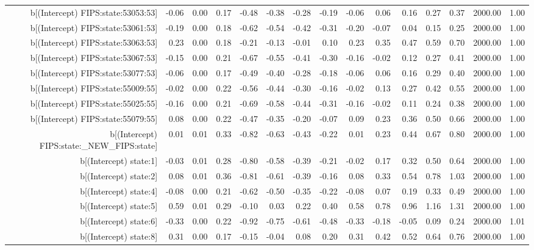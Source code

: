 \begin{table}[ht]
\begin{tabular}{rrrrrrrrrrrrrrr}
  b[(Intercept) FIPS:state:53053:53] & -0.06 & 0.00 & 0.17 & -0.48 & -0.38 & -0.28 & -0.19 & -0.06 & 0.06 & 0.16 & 0.27 & 0.37 & 2000.00 & 1.00 \\ 
  b[(Intercept) FIPS:state:53061:53] & -0.19 & 0.00 & 0.18 & -0.62 & -0.54 & -0.42 & -0.31 & -0.20 & -0.07 & 0.04 & 0.15 & 0.25 & 2000.00 & 1.00 \\ 
  b[(Intercept) FIPS:state:53063:53] & 0.23 & 0.00 & 0.18 & -0.21 & -0.13 & -0.01 & 0.10 & 0.23 & 0.35 & 0.47 & 0.59 & 0.70 & 2000.00 & 1.00 \\ 
  b[(Intercept) FIPS:state:53067:53] & -0.15 & 0.00 & 0.21 & -0.67 & -0.55 & -0.41 & -0.30 & -0.16 & -0.02 & 0.12 & 0.27 & 0.41 & 2000.00 & 1.00 \\ 
  b[(Intercept) FIPS:state:53077:53] & -0.06 & 0.00 & 0.17 & -0.49 & -0.40 & -0.28 & -0.18 & -0.06 & 0.06 & 0.16 & 0.29 & 0.40 & 2000.00 & 1.00 \\ 
  b[(Intercept) FIPS:state:55009:55] & -0.02 & 0.00 & 0.22 & -0.56 & -0.44 & -0.30 & -0.16 & -0.02 & 0.13 & 0.27 & 0.42 & 0.55 & 2000.00 & 1.00 \\ 
  b[(Intercept) FIPS:state:55025:55] & -0.16 & 0.00 & 0.21 & -0.69 & -0.58 & -0.44 & -0.31 & -0.16 & -0.02 & 0.11 & 0.24 & 0.38 & 2000.00 & 1.00 \\ 
  b[(Intercept) FIPS:state:55079:55] & 0.08 & 0.00 & 0.22 & -0.47 & -0.35 & -0.20 & -0.07 & 0.09 & 0.23 & 0.36 & 0.50 & 0.66 & 2000.00 & 1.00 \\ 
  b[(Intercept) FIPS:state:\_NEW\_FIPS:state] & 0.01 & 0.01 & 0.33 & -0.82 & -0.63 & -0.43 & -0.22 & 0.01 & 0.23 & 0.44 & 0.67 & 0.80 & 2000.00 & 1.00 \\ 
  b[(Intercept) state:1] & -0.03 & 0.01 & 0.28 & -0.80 & -0.58 & -0.39 & -0.21 & -0.02 & 0.17 & 0.32 & 0.50 & 0.64 & 2000.00 & 1.00 \\ 
  b[(Intercept) state:2] & 0.08 & 0.01 & 0.36 & -0.81 & -0.61 & -0.39 & -0.16 & 0.08 & 0.33 & 0.54 & 0.78 & 1.03 & 2000.00 & 1.00 \\ 
  b[(Intercept) state:4] & -0.08 & 0.00 & 0.21 & -0.62 & -0.50 & -0.35 & -0.22 & -0.08 & 0.07 & 0.19 & 0.33 & 0.49 & 2000.00 & 1.00 \\ 
  b[(Intercept) state:5] & 0.59 & 0.01 & 0.29 & -0.10 & 0.03 & 0.22 & 0.40 & 0.58 & 0.78 & 0.96 & 1.16 & 1.31 & 2000.00 & 1.00 \\ 
  b[(Intercept) state:6] & -0.33 & 0.00 & 0.22 & -0.92 & -0.75 & -0.61 & -0.48 & -0.33 & -0.18 & -0.05 & 0.09 & 0.24 & 2000.00 & 1.01 \\ 
  b[(Intercept) state:8] & 0.31 & 0.00 & 0.17 & -0.15 & -0.04 & 0.08 & 0.20 & 0.31 & 0.42 & 0.52 & 0.64 & 0.76 & 2000.00 & 1.00 \\ 

\end{tabular}
\end{table}
